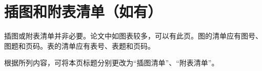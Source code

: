 \chapter*{插图和附表清单（如有）}

插图或附表清单并非必要。论文中如图表较多，可以有此页。图的清单应有图号、图题和页码。表的清单应有表号、表题和页码。

根据所列内容，可将本页标题分别更改为“插图清单”、“附表清单”。
